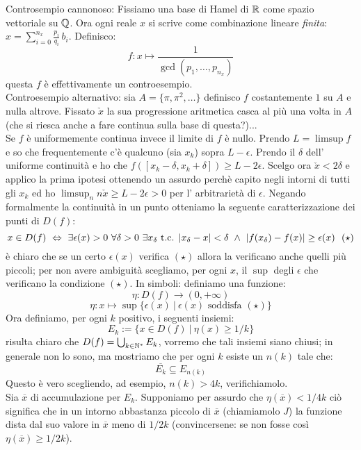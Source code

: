Controsempio cannonoso: Fissiamo una base di Hamel di $\mathbb{R}$ come spazio vettoriale su $\mathbb{Q}$. Ora ogni reale $x$ si scrive come combinazione lineare {\it finita}: $x=\sum_{i=0}^{n_x} \frac{p_i}{q_i}\, b_i$. Definisco:
$$ f:x\mapsto \frac{1}{\gcd(p_1,\ldots,p_{n_x})} $$ 
questa $f$ è effettivamente un controesempio.\\
Controesempio alternativo: sia $A=\{\pi,\pi^2,\ldots\}$ definisco $f$ costantemente $1$ su $A$ e nulla altrove. Fissato $\check{x}$ la sua progressione aritmetica casca al più una volta in $A$ (che si riesca anche a fare continua sulla base di questa?)...\\
Se $f$ è uniformemente continua invece il limite di $f$ è nullo. Prendo $L=\limsup f$ e so che frequentemente c'è qualcuno (sia $x_k$) sopra $L-\epsilon$. Prendo il $\delta$ dell' uniforme continuità e ho che $f([x_k-\delta,x_k+\delta])\ge L-2\epsilon$. Scelgo ora $\check{x}<2\delta$ e applico la prima ipotesi ottenendo un assurdo perchè capito negli intorni di tutti gli $x_k$ ed ho $\limsup_n n\check{x}\ge L-2\epsilon>0$ per l' arbitrarietà di $\epsilon$.
 Negando formalmente la continuità in un punto otteniamo la seguente caratterizzazione dei punti di $D(f)$:
$$
x\in D(f)\ \Leftrightarrow\  \exists \epsilon(x)>0\  \forall \delta>0\  \exists x_\delta \mbox{ t.c. } \vert{x_\delta-x}\vert<\delta\  \wedge\   \vert{f(x_\delta)-f(x)}\vert\geq \epsilon(x)\ \ (\star)
$$
è chiaro che se un certo $\epsilon(x)$ verifica $(\star)$ allora la verificano anche quelli più piccoli; per non avere ambiguità scegliamo, per ogni $x$, il $\sup$ degli $\epsilon$ che verificano la condizione $(\star)$. In simboli: definiamo una funzione:
$$
\eta: D(f)\rightarrow (0,+\infty)
$$
$$
\eta: x\mapsto \sup\{\epsilon(x)\ \vert\ \epsilon(x) \mbox{ soddisfa } (\star) \}
$$
Ora definiamo, per ogni $k$ positivo, i seguenti insiemi:
$$
E_k:=\{x\in D(f)\ \vert\  \eta(x)\geq 1/k \}
$$
risulta chiaro che $D(f)=\bigcup_{k\in\mathbb{N}^{*}} E_k$, vorremo che tali insiemi siano chiusi; in generale non lo sono, ma mostriamo che per ogni $k$ esiste un $n(k)$ tale che:
$$
\overline{E_k}\subseteq E_{n(k)}
$$
Questo è vero scegliendo, ad esempio, $n(k)>4k$, verifichiamolo.\\
Sia $\overline{x}$ di accumulazione per $E_k$. Supponiamo per assurdo che $\eta(\overline{x})<1/4k$ ciò significa che in un intorno abbastanza piccolo di $\overline{x}$ (chiamiamolo $J$) la funzione dista dal suo valore in $\overline{x}$ meno di $1/2k$ (convincersene: se non fosse così $\eta(\overline{x})\geq 1/2k$).\\
